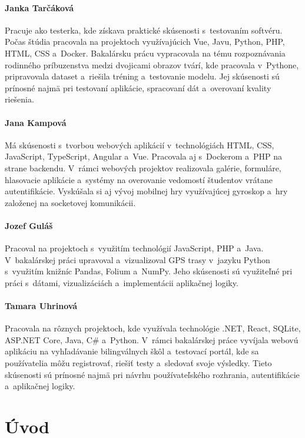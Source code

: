 \documentclass[a4paper, 12pt]{article}
\begin{document}
\paragraph*{Janka Tarčáková}
Pracuje ako testerka, kde získava praktické skúsenosti s~testovaním softvéru. Počas štúdia pracovala na projektoch využívajúcich Vue, Javu, Python, PHP, HTML, CSS a~Docker. Bakalársku prácu vypracovala na tému rozpoznávania rodinného príbuzenstva medzi dvojicami obrazov tvárí, kde pracovala v~Pythone, pripravovala dataset a~riešila tréning a~testovanie modelu. Jej skúsenosti sú prínosné najmä pri testovaní aplikácie, spracovaní dát a~overovaní kvality riešenia.

\paragraph*{Jana Kampová}
Má skúsenosti s~tvorbou webových aplikácií v~technológiách HTML, CSS, JavaScript, TypeScript, Angular a~Vue. Pracovala aj s~Dockerom a~PHP na strane backendu. V~rámci webových projektov realizovala galérie, formuláre, hlasovacie aplikácie a~systémy na overovanie vedomostí študentov vrátane autentifikácie. Vyskúšala si aj vývoj mobilnej hry využívajúcej gyroskop a~hry založenej na socketovej komunikácii.

\paragraph*{Jozef Guláš}
Pracoval na projektoch s~využitím technológií JavaScript, PHP a~Java. V~bakalárskej práci upravoval a~vizualizoval GPS trasy v~jazyku Python s~využitím knižníc Pandas, Folium a~NumPy. Jeho skúsenosti sú využiteľné pri práci s~dátami, vizualizáciách a~implementácii aplikačnej logiky.

\paragraph*{Tamara Uhrinová}
Pracovala na rôznych projektoch, kde využívala technológie .NET, React, SQLite, ASP.NET Core, Java, C\# a~Python. V~rámci bakalárskej práce vyvíjala webovú aplikáciu na vyhľadávanie bilingválnych škôl a~testovací portál, kde sa používatelia môžu registrovať, riešiť testy a~sledovať svoje výsledky. Tieto skúsenosti sú prínosné najmä pri návrhu používateľského rozhrania, autentifikácie a~aplikačnej logiky.

\clearpage
\tableofcontents
\clearpage
{}

\section{Úvod}
\end{document}
